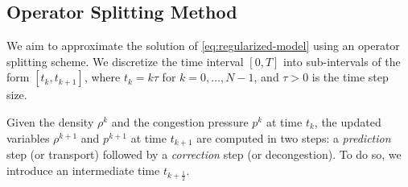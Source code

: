 \documentclass[final,reqno]{amsart}
\theoremstyle{plain}
\theoremstyle{definition}
\theoremstyle{remark}
\numberwithin{remark}{section}	%
\numberwithin{example}{section}	%
\begin{document}
\subsection{Operator Splitting Method}
We aim to approximate the solution of \eqref{eq:regularized-model} using an operator splitting scheme. We discretize the time interval $[0,T]$ into sub-intervals of the form $[t_k,t_{k+1}]$, where $t_k = k\tau$ for $k=0,\dots,N-1$, and $\tau > 0$ is the time step size.

Given the density $\rho^k$ and the congestion pressure $p^k$ at time $t_k$, the updated variables $\rho^{k+1}$ and $p^{k+1}$ at time $t_{k+1}$ are computed in two steps: a \emph{prediction} step (or transport) followed by a \emph{correction} step (or decongestion). To do so, we introduce an intermediate time $t_{k+\frac{1}{2}}$.
\end{document}
